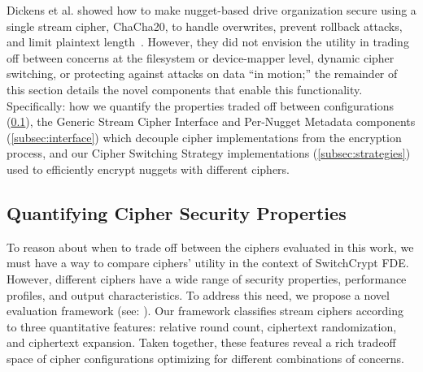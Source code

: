 Dickens et al. showed how to make nugget-based drive organization secure using a
single stream cipher, ChaCha20, to handle overwrites, prevent rollback attacks,
and limit plaintext length~\cite{StrongBox}. However, they did not envision the
utility in trading off between concerns at the filesystem or device-mapper
level, dynamic cipher switching, or protecting against attacks on data ``in
motion;'' the remainder of this section details the novel components that enable
this functionality. Specifically: how we quantify the properties traded off
between configurations (\cref{subsec:quantify}), the Generic Stream Cipher
Interface and Per-Nugget Metadata components (\cref{subsec:interface}) which
decouple cipher implementations from the encryption process, and our Cipher
Switching Strategy implementations (\cref{subsec:strategies}) used to
efficiently encrypt nuggets with different ciphers.

\subsection{Quantifying Cipher Security Properties} \label{subsec:quantify}

To reason about when to trade off between the ciphers evaluated in this work, we
must have a way to compare ciphers' utility in the context of SwitchCrypt FDE.
However, different ciphers have a wide range of security properties, performance
profiles, and output characteristics. To address this need, we propose a novel
evaluation framework (see: ). Our framework classifies
stream ciphers according to three quantitative features: relative round count,
ciphertext randomization, and ciphertext expansion. Taken together, these
features reveal a rich tradeoff space of cipher configurations optimizing for
different combinations of concerns.

